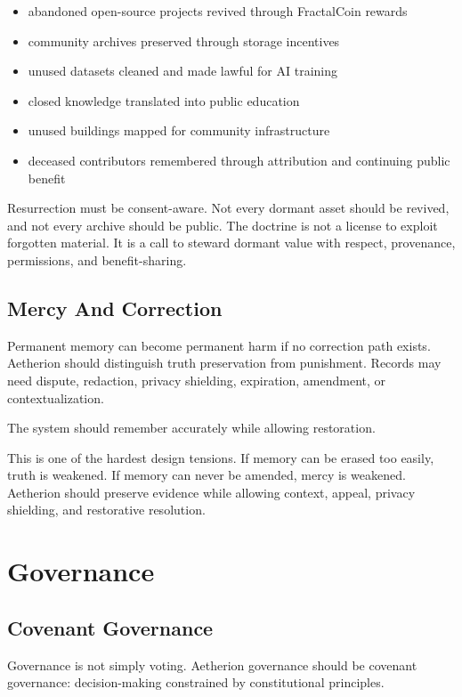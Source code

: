 \documentclass[12pt]{article}
\begin{document}
\begin{itemize}
  \item abandoned open-source projects revived through FractalCoin rewards
  \item community archives preserved through storage incentives
  \item unused datasets cleaned and made lawful for AI training
  \item closed knowledge translated into public education
  \item unused buildings mapped for community infrastructure
  \item deceased contributors remembered through attribution and continuing public benefit
\end{itemize}

Resurrection must be consent-aware. Not every dormant asset should be revived, and not every archive should be public. The doctrine is not a license to exploit forgotten material. It is a call to steward dormant value with respect, provenance, permissions, and benefit-sharing.

\subsection{Mercy And Correction}

Permanent memory can become permanent harm if no correction path exists. Aetherion should distinguish truth preservation from punishment. Records may need dispute, redaction, privacy shielding, expiration, amendment, or contextualization.

The system should remember accurately while allowing restoration.

This is one of the hardest design tensions. If memory can be erased too easily, truth is weakened. If memory can never be amended, mercy is weakened. Aetherion should preserve evidence while allowing context, appeal, privacy shielding, and restorative resolution.

\section{Governance}

\subsection{Covenant Governance}

Governance is not simply voting. Aetherion governance should be covenant governance: decision-making constrained by constitutional principles.
\end{document}
